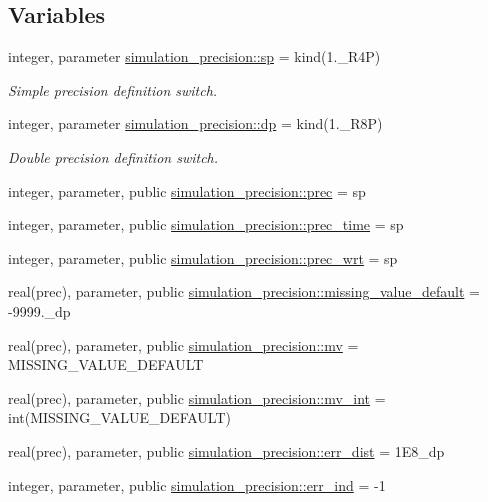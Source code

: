 \subsection*{Variables}
\begin{DoxyCompactItemize}
\item 
integer, parameter \mbox{\hyperlink{namespacesimulation__precision_a3657003647318cfe37c797ab37448a2e}{simulation\+\_\+precision\+::sp}} = kind(1.\+\_\+\+R4P)
\begin{DoxyCompactList}\small\item\em Simple precision definition switch. \end{DoxyCompactList}\item 
integer, parameter \mbox{\hyperlink{namespacesimulation__precision_af01fc62f503e0ff9a95c9ee2960c9a7f}{simulation\+\_\+precision\+::dp}} = kind(1.\+\_\+\+R8P)
\begin{DoxyCompactList}\small\item\em Double precision definition switch. \end{DoxyCompactList}\item 
integer, parameter, public \mbox{\hyperlink{namespacesimulation__precision_a6d3bcd3b4ff2cfb92ec9fe36ecad405b}{simulation\+\_\+precision\+::prec}} = sp
\item 
integer, parameter, public \mbox{\hyperlink{namespacesimulation__precision_a09a1db15abeed81ff2f54b363128ffed}{simulation\+\_\+precision\+::prec\+\_\+time}} = sp
\item 
integer, parameter, public \mbox{\hyperlink{namespacesimulation__precision_a049e8de4fad9c285d2cc71e8982e2971}{simulation\+\_\+precision\+::prec\+\_\+wrt}} = sp
\item 
real(prec), parameter, public \mbox{\hyperlink{namespacesimulation__precision_a5983f631bbe7a6e5d43d2a458db81460}{simulation\+\_\+precision\+::missing\+\_\+value\+\_\+default}} = -\/9999.\+\_\+dp
\item 
real(prec), parameter, public \mbox{\hyperlink{namespacesimulation__precision_a4416a112b4fc53848f9f18fe5e9003db}{simulation\+\_\+precision\+::mv}} = M\+I\+S\+S\+I\+N\+G\+\_\+\+V\+A\+L\+U\+E\+\_\+\+D\+E\+F\+A\+U\+LT
\item 
real(prec), parameter, public \mbox{\hyperlink{namespacesimulation__precision_ae23a853ee1499839ea702b3c01e443fc}{simulation\+\_\+precision\+::mv\+\_\+int}} = int(M\+I\+S\+S\+I\+N\+G\+\_\+\+V\+A\+L\+U\+E\+\_\+\+D\+E\+F\+A\+U\+LT)
\item 
real(prec), parameter, public \mbox{\hyperlink{namespacesimulation__precision_acb6a32a47c43de36b53bb8033aa2738e}{simulation\+\_\+precision\+::err\+\_\+dist}} = 1\+E8\+\_\+dp
\item 
integer, parameter, public \mbox{\hyperlink{namespacesimulation__precision_a531d4e8c47b468cf4212393a5b84c7c8}{simulation\+\_\+precision\+::err\+\_\+ind}} = -\/1
\end{DoxyCompactItemize}
